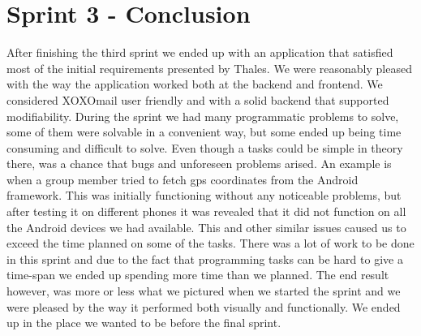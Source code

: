 \section{Sprint 3 - Conclusion}
After finishing the third sprint we ended up with an application that satisfied most of the initial requirements presented by Thales. We were reasonably pleased with the way the application worked both at the backend and frontend. We considered XOXOmail user friendly and with a solid backend that supported modifiability. 
\newline
\newline
During the sprint we had many programmatic problems to solve, some of them were solvable in a convenient way, but some ended up being time consuming and difficult to solve. Even though a tasks could be simple in theory there, was a chance that bugs and unforeseen problems arised. An example is when a group member tried to fetch gps coordinates from the Android framework. This was initially functioning without any noticeable problems, but after testing it on different phones it was revealed that it did not function on all the Android devices we had available. This and other similar issues caused us to exceed the time planned on some of the tasks. 
\newline
\newline
There was a lot of work to be done in this sprint and due to the fact that programming tasks can be hard to give a time-span we ended up spending more time than we planned. The end result however, was more or less what we pictured when we started the sprint and we were pleased by the way it performed both visually and functionally. We ended up in the place we wanted to be before the final sprint.